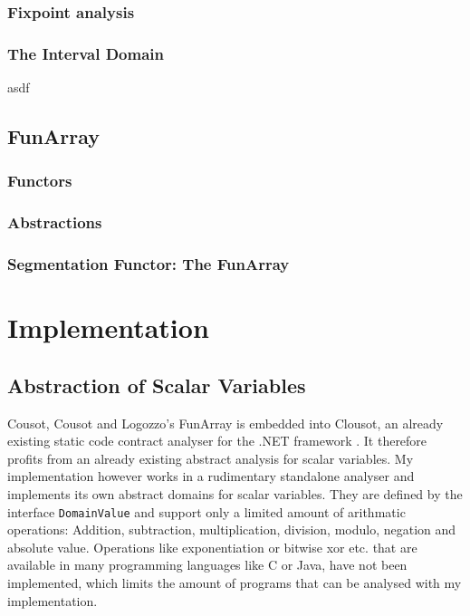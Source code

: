\documentclass{report}
\begin{document}
\subsection{Fixpoint analysis}

\subsection{The Interval Domain}
asdf



\section{FunArray}
\subsection{Functors}
\subsection{Abstractions}
\subsection{Segmentation Functor: The FunArray}




\chapter{Implementation}



\section{Abstraction of Scalar Variables}\label{sec:scalarvariables}
Cousot, Cousot and Logozzo's FunArray is embedded into Clousot, an already existing static code contract analyser for the .NET framework \cite{cousot2011}. It therefore profits from an already existing abstract analysis for scalar variables. My implementation however works in a rudimentary standalone analyser and implements its own abstract domains for scalar variables.
They are defined by the interface \texttt{DomainValue} and support only a limited amount of arithmatic operations: Addition, subtraction, multiplication, division, modulo, negation and absolute value. Operations like exponentiation or bitwise xor etc. that are available in many programming languages like C or Java, have not been implemented, which limits the amount of programs that can be analysed with my implementation. 
\end{document}
